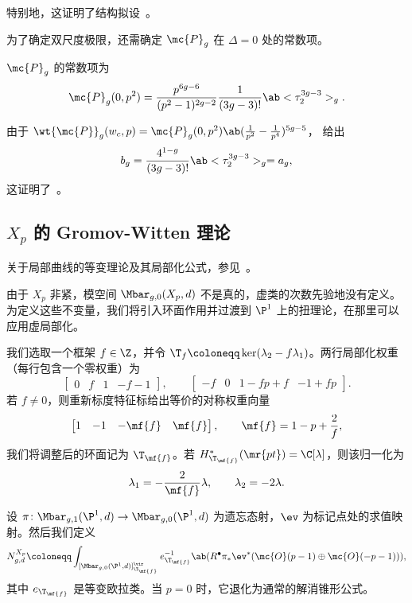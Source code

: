 特别地，这证明了结构拟设~。

为了确定双尺度极限，还需确定 \(\mc{P}_g\) 在 \(\Delta = 0\) 处的常数项。

\begin{thm}%
\label{thm:local P1 constant term}
    \(\mc{P}_g\) 的常数项为
    \[ \mc{P}_g(0,p^2) = \frac{p^{6g-6}}{(p^2-1)^{2g-2}}\frac{1}{(3g-3)!}\ab<\tau_2^{3g-3}>_g. \]
\end{thm}

由于 \(\wt{\mc{P}}_g(w_c,p) = \mc{P}_g(0,p^2)\ab(\frac{1}{p^2}-\frac{1}{p^4})^{5g-5}\)， 给出
\[ b_g = \frac{4^{1-g}}{(3g-3)!}\ab<\tau_2^{3g-3}>_g = a_g, \]
这证明了~。

\subsection{\(X_p\) 的 Gromov-Witten 理论}%
\label{sub:Gromov-Witten theory of Xp}

关于局部曲线的等变理论及其局部化公式，参见~\cite{BryanPandharipande2008}。

由于 \(X_p\) 非紧，模空间 \(\Mbar_{g,0}(X_p,d)\) 不是真的，虚类的次数先验地没有定义。为定义这些不变量，我们将引入环面作用并过渡到 \(\P^1\) 上的扭理论，在那里可以应用虚局部化。

我们选取一个框架 \(f \in \Z\)，并令 \(\T_f \coloneqq \ker(\lambda_2 - f\lambda_1)\)。两行局部化权重（每行包含一个零权重）为
\[ \begin{bmatrix} 0 & f & 1 & -f-1 \end{bmatrix}, \qquad \begin{bmatrix} -f & 0 & 1-fp+f & -1+fp \end{bmatrix}. \]
若 \(f \neq 0\)，则重新标度特征标给出等价的对称权重向量
\[ \begin{bmatrix} 1 & -1 & -\mf{f} & \mf{f} \end{bmatrix}, \qquad \mf{f} = 1-p+\frac{2}{f}, \]
我们将调整后的环面记为 \(\T_{\mf{f}}\)。若 \(H^*_{\T_{\mf{f}}}(\mr{pt}) = \C[\lambda]\)，则该归一化为
\[ \lambda_1 = -\frac{2}{\mf{f}}\lambda, \qquad \lambda_2 = -2\lambda. \]

设 \(\pi \colon \Mbar_{g,1}(\P^1,d) \to \Mbar_{g,0}(\P^1,d)\) 为遗忘态射，\(\ev\) 为标记点处的求值映射。然后我们定义
\[ N^{X_p}_{g,d} \coloneqq \int_{[\Mbar_{g,0}(\P^1,d)]^{\vir}_{\T_{\mf{f}}}} e_{\T_{\mf{f}}}^{-1}\ab(R^{\bullet}\pi_* \ev^*(\mc{O}(p-1)\oplus\mc{O}(-p-1))), \]
其中 \(e_{\T_{\mf{f}}}\) 是等变欧拉类。当 \(p=0\) 时，它退化为通常的解消锥形公式。

